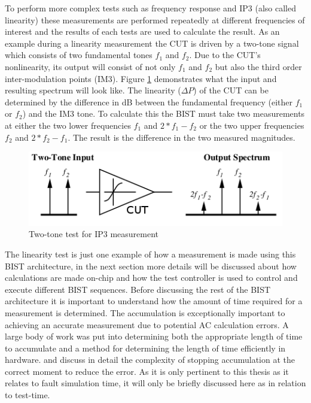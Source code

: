 \documentclass[12pt]{report}
\begin{document}
To perform more complex tests such as frequency response and IP3 (also called linearity) these measurements are performed repeatedly at different frequencies of interest and the results of each tests are used to calculate the result.  As an example during a linearity measurement the CUT is driven by a two-tone signal which consists of two fundamental tones $f_1$ and $f_2$.  Due to the CUT's nonlinearity, its output will consist of not only $f_1$ and $f_2$ but also the third order inter-modulation points (IM3)\cite{testtime}.  Figure \ref{fig:linearity-spectrum} demonstrates what the input and resulting spectrum will look like\cite{testtime}.  The linearity ($\Delta P$) of the CUT can be determined by the difference in dB between the fundamental frequency (either $f_1$ or $f_2$) and the IM3 tone\cite{basessa}.  To calculate this the BIST must take two measurements at either the two lower frequencies $f_1$ and $2*f_1-f_2$ or the two upper frequencies $f_2$ and $2*f_2-f_1$\cite{testtime}.  The result is the difference in the two measured magnitudes.
\begin{figure}
	\begin{center}
		\includegraphics[scale=.7]{images/linearity-spectrum}
	\end{center}
	\caption{Two-tone test for IP3 measurement\cite{testtime}}
	\label{fig:linearity-spectrum}
\end{figure}
The linearity test is just one example of how a measurement is made using this BIST architecture, in the next section more details will be discussed about how calculations are made on-chip and how the test controller is used to control and execute different BIST sequences.  Before discussing the rest of the BIST architecture it is important to understand how the amount of time required for a measurement is determined.  The accumulation is exceptionally important to achieving an accurate measurement due to potential AC calculation errors\cite{jie}.  A large body of work was put into determining both the appropriate length of time to accumulate and a method for determining the length of time efficiently in hardware.  \cite{jie} and \cite{testtime} discuss in detail the complexity of stopping accumulation at the correct moment to reduce the error.  As it is only pertinent to this thesis as it relates to fault simulation time, it will only be briefly discussed here as in relation to test-time.
\end{document}
